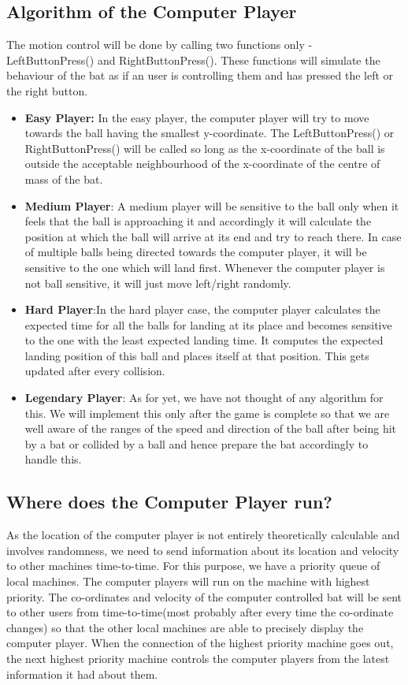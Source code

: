 \documentclass{article}
\begin{document}
\subsection{Algorithm of the Computer Player}
The motion control will be done by calling two functions only - LeftButtonPress() and RightButtonPress(). These functions will simulate the behaviour of the bat as if an user is controlling them and has pressed the left or the right button.
\begin{itemize}
    \item \textbf{Easy Player:} In the easy player, the computer player will try to move towards the ball having the smallest y-coordinate. The LeftButtonPress() or RightButtonPress() will be called so long as the x-coordinate of the ball is outside the acceptable neighbourhood of the x-coordinate of the centre of mass of the bat. 
    \item \textbf{Medium Player}: A medium player will be sensitive to the ball only when it feels that the ball is approaching it and accordingly it will calculate the position at which the ball will arrive at its end and try to reach there. In case of multiple balls being directed towards the computer player, it will be sensitive to the one which will land first. Whenever the computer player is not ball sensitive, it will just move left/right randomly.
    \item \textbf{Hard Player}:In the hard player case, the computer player calculates the expected time for all the balls for landing at its place and becomes sensitive to the one with the least expected landing time. It computes the expected landing position of this ball and places itself at that position. This gets updated after every collision.
    \item \textbf{Legendary Player}: As for yet, we have not thought of any algorithm for this. We will implement this only after the game is complete so that we are well aware of the ranges of the speed and direction of the ball after being hit by a bat or collided by a ball and hence prepare the bat accordingly to handle this.
\end{itemize}
\subsection{Where does the Computer Player run?} As the location of the computer player is not entirely theoretically calculable and involves randomness, we need to send information about its location and velocity to other machines time-to-time. For this purpose, we have a priority queue of local machines. The computer players will run on the machine with highest priority. The co-ordinates and velocity of the computer controlled bat will be sent to other users from time-to-time(most probably after every time the co-ordinate changes) so that the other local machines are able to precisely display the computer player. When the connection of the highest priority machine goes out, the next highest priority machine controls the computer players from the latest information it had about them.  
\end{document}
